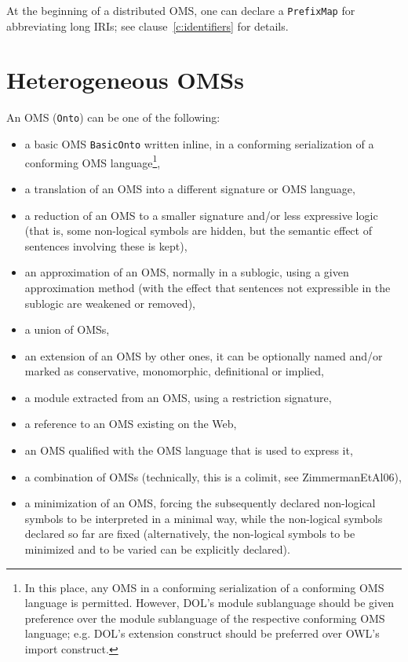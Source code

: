 \documentclass[10pt,%
\ifpretendfinal
final%
\else
draft%
\fi,
]{scrreprt}
\makeatletter
\newcommand*{\eg}{e.g.\@\xspace}
\newcommand*{\syntax}[1]{\texttt{#1}}
\newcommand{\clauserefname}{clause}
\newcommand{\bref}[1]{[\ref{#1}]}
\newcommand{\cref}[1]{\clauserefname~\ref{#1}}
\newcommand{\sclause}[1]{\section{#1}}
\renewcommand{\bref}[1]{#1}
\makeatother
\begin{document}
At the beginning of a distributed OMS, one can declare a \syntax{PrefixMap} for abbreviating long IRIs; see \cref{c:identifiers} for details.

\sclause{Heterogeneous OMSs}

An OMS (\syntax{Onto}) can be one of the following:
\begin{itemize}
\item a basic OMS \syntax{BasicOnto} written inline, in a conforming serialization of a conforming OMS language\footnote{In this place, any OMS in a conforming serialization of a conforming OMS language is permitted.  However, DOL's module sublanguage should be given preference over the module sublanguage of the respective conforming OMS language; \eg DOL's extension construct should be preferred over OWL's import construct.},
\item a translation of an OMS into a different signature or OMS
language,
\item a reduction of an OMS to a smaller signature and/or less
expressive logic (that is,
some non-logical symbols are hidden, but the semantic effect of sentences involving these is kept),
\item an approximation of an OMS, normally in a sublogic, using a given approximation method (with the effect that sentences not expressible in the sublogic are weakened or removed),
\item a union of OMSs,
\item an extension of an OMS by other ones, it can be optionally named and/or marked as conservative, monomorphic, definitional or implied,
\item a module extracted from an OMS, using a restriction signature,
\item a reference to an OMS existing on the Web,
\item an OMS qualified with the OMS language that is used to express it,
\item a combination of OMSs (technically, this is a colimit, see \bref{ZimmermanEtAl06}),
\item a minimization of an OMS, forcing the subsequently declared
  non-logical symbols to be interpreted in a minimal way, while the non-logical symbols declared so far are fixed (alternatively, the non-logical symbols to be minimized and to be varied can be explicitly declared).
\end{itemize}
\end{document}
